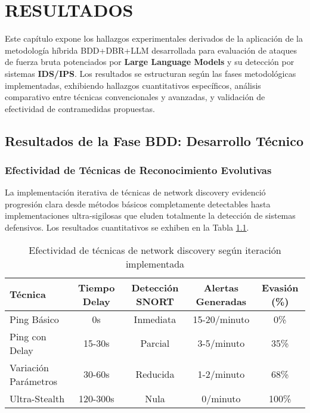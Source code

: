\chapter{RESULTADOS}

Este capítulo expone los hallazgos experimentales derivados de la aplicación de la metodología híbrida BDD+DBR+LLM desarrollada para evaluación de ataques de fuerza bruta potenciados por \textbf{Large Language Models} y su detección por sistemas \textbf{IDS/IPS}. Los resultados se estructuran según las fases metodológicas implementadas, exhibiendo hallazgos cuantitativos específicos, análisis comparativo entre técnicas convencionales y avanzadas, y validación de efectividad de contramedidas propuestas.

\section{Resultados de la Fase BDD: Desarrollo Técnico}

\subsection{Efectividad de Técnicas de Reconocimiento Evolutivas}

La implementación iterativa de técnicas de network discovery evidenció progresión clara desde métodos básicos completamente detectables hasta implementaciones ultra-sigilosas que eluden totalmente la detección de sistemas defensivos. Los resultados cuantitativos se exhiben en la Tabla \ref{tab:network_discovery_results}.

\begin{table}[h]
\centering
\caption{Efectividad de técnicas de network discovery según iteración implementada}
\label{tab:network_discovery_results}
\begin{tabular}{|l|c|c|c|c|}
\hline
\textbf{Técnica} & \textbf{Tiempo Delay} & \textbf{Detección SNORT} & \textbf{Alertas Generadas} & \textbf{Evasión (\%)} \\
\hline
Ping Básico & 0s & Inmediata & 15-20/minuto & 0\% \\
\hline
Ping con Delay & 15-30s & Parcial & 3-5/minuto & 35\% \\
\hline
Variación Parámetros & 30-60s & Reducida & 1-2/minuto & 68\% \\
\hline
Ultra-Stealth & 120-300s & Nula & 0/minuto & 100\% \\
\hline
\end{tabular}
\end{table}

